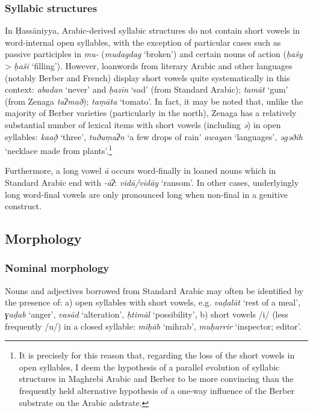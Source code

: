 \documentclass[output=paper]{langsci/langscibook}
\begin{document}
\subsubsection{ Syllabic structures} %

In Ḥassāniyya, Arabic-derived syllabic structures do not contain short vowels in word-internal open syllables, with the exception of particular cases such as passive participles in \textit{mu-} (\textit{mudagdag} ‘broken’) and certain nouns of action (\textit{ḥašy} > \textit{ḥaši} ‘filling’). However, loanwords from literary Arabic and other languages (notably Berber and French) display short vowels quite systematically in this context: \textit{abadan} ‘never’ and \textit{ḥazīn} ‘sad’ (from Standard Arabic); \textit{tamāt} ‘gum’ (from Zenaga \textit{taʔmað}); \textit{taṃāta} ‘tomato’. In fact, it may be noted that, unlike the majority of Berber varieties (particularly in the north), Zenaga has a relatively substantial number of lexical items with short vowels (including \textit{ə}) in open syllables: \textit{ka{\R}að̣} ‘three’, \textit{tuðu}\textit{ṃaʔn} ‘a few drops of rain’ \textit{awayan} ‘languages’, \textit{əgəðih} ‘necklace made from plants'.\footnote{It is precisely for this reason that, regarding the loss of the short vowels in open syllables, I deem the hypothesis of a parallel evolution of syllabic structures in Maghrebi Arabic and Berber to be more convincing than the frequently held alternative hypothesis of a one-way influence of the Berber substrate on the Arabic adstrate.} 

Furthermore, a long vowel \textit{ā} occurs word-finally in loaned nouns which in Standard Arabic end with \textit{{}-āʔ}: \textit{vidā/vidāy} ‘ransom’. In other cases, underlyingly long word-final vowels are only pronounced long when non-final in a genitive construct.

\subsection{ Morphology} %

\subsubsection{ Nominal morphology} %


Nouns and adjectives borrowed from Standard Arabic may often be identified by the presence of: a) open syllables with short vowels, e.g. \textit{vaḍa}\textit{lāt} ‘rest of a meal’, \textit{ɣaḍab} ‘anger’, \textit{vasād} ‘alteration’, \textit{ḥtimāl} ‘possibility’, b) short vowels /i/ (less frequently /u/) in a closed syllable: \textit{miḥ{\R}āb} ‘mihrab’, \textit{muḥarrir} ‘inspector; editor’.
\end{document}
